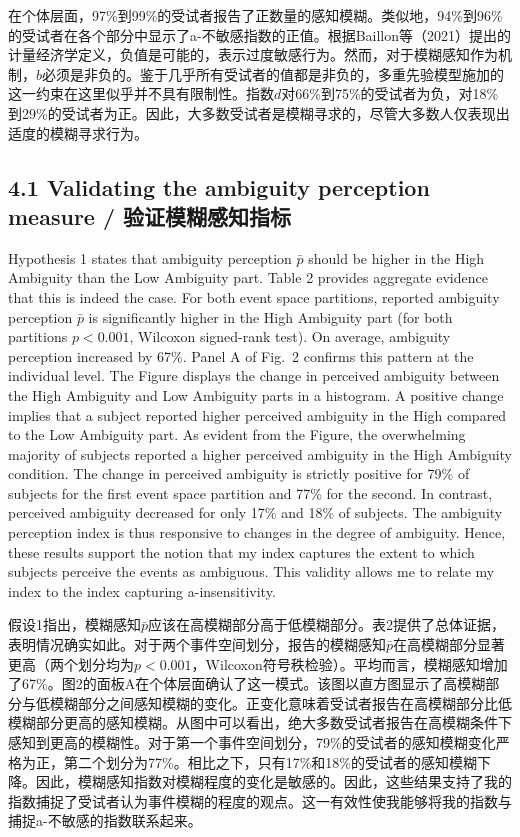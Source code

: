 \documentclass[12pt,a4paper]{article}
\newenvironment{original}
  {\par\medskip\noindent\color{black}\ignorespaces}
  {\par\medskip}
\newenvironment{translation}
  {\par\noindent\color{transblue}\ignorespaces}
  {\par\medskip\medskip}
\begin{document}
\begin{translation}
在个体层面，97\%到99\%的受试者报告了正数量的感知模糊。类似地，94\%到96\%的受试者在各个部分中显示了a-不敏感指数的正值。根据Baillon等（2021）提出的计量经济学定义，负值是可能的，表示过度敏感行为。然而，对于模糊感知作为机制，$b$必须是非负的。鉴于几乎所有受试者的值都是非负的，多重先验模型施加的这一约束在这里似乎并不具有限制性。指数$d$对66\%到75\%的受试者为负，对18\%到29\%的受试者为正。因此，大多数受试者是模糊寻求的，尽管大多数人仅表现出适度的模糊寻求行为。
\end{translation}

\subsection{4.1 Validating the ambiguity perception measure / 验证模糊感知指标}

\begin{original}
Hypothesis 1 states that ambiguity perception $\bar{p}$ should be higher in the High Ambiguity than the Low Ambiguity part. Table 2 provides aggregate evidence that this is indeed the case. For both event space partitions, reported ambiguity perception $\bar{p}$ is significantly higher in the High Ambiguity part (for both partitions $p < 0.001$, Wilcoxon signed-rank test). On average, ambiguity perception increased by 67\%. Panel A of Fig.\ 2 confirms this pattern at the individual level. The Figure displays the change in perceived ambiguity between the High Ambiguity and Low Ambiguity parts in a histogram. A positive change implies that a subject reported higher perceived ambiguity in the High compared to the Low Ambiguity part. As evident from the Figure, the overwhelming majority of subjects reported a higher perceived ambiguity in the High Ambiguity condition. The change in perceived ambiguity is strictly positive for 79\% of subjects for the first event space partition and 77\% for the second. In contrast, perceived ambiguity decreased for only 17\% and 18\% of subjects. The ambiguity perception index is thus responsive to changes in the degree of ambiguity. Hence, these results support the notion that my index captures the extent to which subjects perceive the events as ambiguous. This validity allows me to relate my index to the index capturing a-insensitivity.
\end{original}

\begin{translation}
假设1指出，模糊感知$\bar{p}$应该在高模糊部分高于低模糊部分。表2提供了总体证据，表明情况确实如此。对于两个事件空间划分，报告的模糊感知$\bar{p}$在高模糊部分显著更高（两个划分均为$p < 0.001$，Wilcoxon符号秩检验）。平均而言，模糊感知增加了67\%。图2的面板A在个体层面确认了这一模式。该图以直方图显示了高模糊部分与低模糊部分之间感知模糊的变化。正变化意味着受试者报告在高模糊部分比低模糊部分更高的感知模糊。从图中可以看出，绝大多数受试者报告在高模糊条件下感知到更高的模糊性。对于第一个事件空间划分，79\%的受试者的感知模糊变化严格为正，第二个划分为77\%。相比之下，只有17\%和18\%的受试者的感知模糊下降。因此，模糊感知指数对模糊程度的变化是敏感的。因此，这些结果支持了我的指数捕捉了受试者认为事件模糊的程度的观点。这一有效性使我能够将我的指数与捕捉a-不敏感的指数联系起来。
\end{translation}
\end{document}
